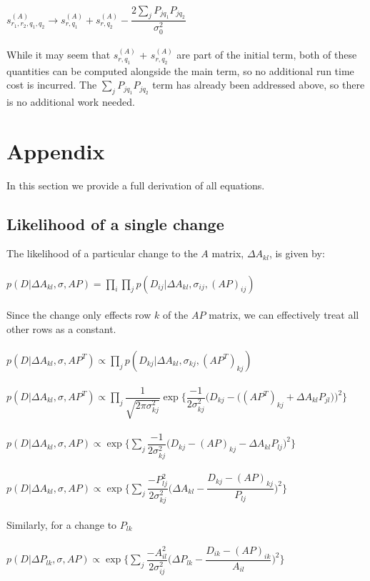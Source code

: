 \documentclass[]{article}
\begin{document}
\\
$s^{(A)}_{r_1,r_2,q_1,q_2} \rightarrow s^{(A)}_{r,q_1} + s^{(A)}_{r,q_2} - \dfrac{2\sum_j P_{jq_1}P_{jq_2}}{\sigma_0^2}$\\
\\
While it may seem that $s^{(A)}_{r,q_1}$ + $s^{(A)}_{r,q_2}$ are part of the initial term, both of these quantities can be computed alongside the main term, so no additional run time cost is incurred. The $\sum_j P_{jq_1}P_{jq_2}$ term has already been addressed above, so there is no additional work needed.

\section{Appendix}

In this section we provide a full derivation of all equations.

\subsection{Likelihood of a single change}

The likelihood of a particular change to the $A$ matrix, $\Delta A_{kl}$, is given by:\\
\\
$p(D|\Delta A_{kl},\sigma,AP) = \prod_i \prod_j p(D_{ij}|\Delta A_{kl},\sigma_{ij},(AP)_{ij})$\\
\\
Since the change only effects row $k$ of the $AP$ matrix, we can effectively treat all other rows as a constant.\\
\\
$p(D|\Delta A_{kl},\sigma,AP^T) \propto \prod_j p(D_{kj}|\Delta A_{kl},\sigma_{kj},(AP^T)_{kj})$\\
\\
$p(D|\Delta A_{kl},\sigma,AP^T) \propto \prod_j \dfrac{1}{\sqrt{2\pi\sigma_{kj}^2}}\exp\biggr\{\dfrac{-1}{2\sigma_{kj}^2} \biggr(D_{kj} - \big((AP^T)_{kj} + \Delta A_{kl}P_{jl}\big)\biggr)^2 \biggr\}$\\
\\
$p(D|\Delta A_{kl},\sigma,AP) \propto \exp\biggr\{\sum_j\dfrac{-1}{2\sigma_{kj}^2} \biggr(D_{kj} - (AP)_{kj} - \Delta A_{kl}P_{lj}\biggr)^2 \biggr\}$\\
\\
$p(D|\Delta A_{kl},\sigma,AP) \propto \exp\biggr\{\sum_j\dfrac{-P_{lj}^2}{2\sigma_{kj}^2} \biggr(\Delta A_{kl} - \dfrac{D_{kj} - (AP)_{kj}}{P_{lj}}\biggr)^2 \biggr\}$\\
\\
Similarly, for a change to $P_{lk}$\\
\\
$p(D|\Delta P_{lk},\sigma,AP) \propto \exp\biggr\{\sum_j\dfrac{-A_{il}^2}{2\sigma_{ij}^2} \biggr(\Delta P_{lk} - \dfrac{D_{ik} - (AP)_{ik}}{A_{il}}\biggr)^2 \biggr\}$
\end{document}
